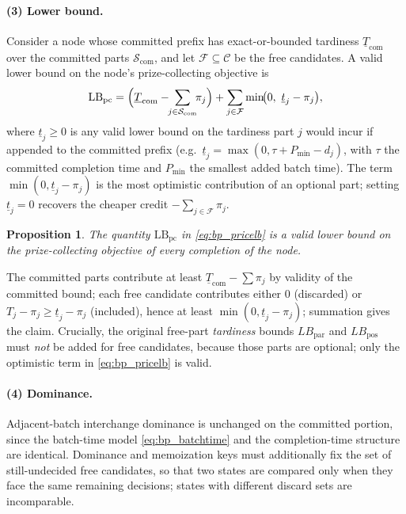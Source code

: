 \documentclass[review,3p,times,authoryear]{elsarticle}
\newtheorem{proposition}{Proposition}
\begin{document}
\paragraph{(3) Lower bound.} Consider a node whose committed prefix has
exact-or-bounded tardiness $\underline{T}_{\mathrm{com}}$ over the committed parts
$\mathcal{S}_{\mathrm{com}}$, and let $\mathcal{F}\subseteq\mathcal{C}$ be the
free candidates. A valid lower bound on the node's prize-collecting objective is
\begin{equation}
\mathrm{LB}_{\mathrm{pc}}=
\Bigl(\underline{T}_{\mathrm{com}}-\!\!\sum_{j\in\mathcal{S}_{\mathrm{com}}}\!\!\pi_j\Bigr)
+\sum_{j\in\mathcal{F}}\min\!\bigl(0,\ \underline{t}_j-\pi_j\bigr),
\label{eq:bp_pricelb}
\end{equation}
where $\underline{t}_j\ge 0$ is any valid lower bound on the tardiness part $j$
would incur if appended to the committed prefix (e.g.\
$\underline{t}_j=\max(0,\tau+P_{\min}-d_j)$, with $\tau$ the committed completion
time and $P_{\min}$ the smallest added batch time). The term
$\min(0,\underline{t}_j-\pi_j)$ is the most optimistic contribution of an optional
part; setting $\underline{t}_j=0$ recovers the cheaper credit
$-\sum_{j\in\mathcal{F}}\pi_j$.

\begin{proposition}
The quantity $\mathrm{LB}_{\mathrm{pc}}$ in \eqref{eq:bp_pricelb} is a valid lower
bound on the prize-collecting objective of every completion of the node.
\end{proposition}
\noindent The committed parts contribute at least
$\underline{T}_{\mathrm{com}}-\sum\pi_j$ by validity of the committed bound; each
free candidate contributes either $0$ (discarded) or
$T_j-\pi_j\ge\underline{t}_j-\pi_j$ (included), hence at least
$\min(0,\underline{t}_j-\pi_j)$; summation gives the claim. Crucially, the original
free-part \emph{tardiness} bounds $LB_{\mathrm{par}}$ and $LB_{\mathrm{pos}}$ must
\emph{not} be added for free candidates, because those parts are optional; only the
optimistic term in \eqref{eq:bp_pricelb} is valid.

\paragraph{(4) Dominance.} Adjacent-batch interchange dominance is unchanged on the
committed portion, since the batch-time model \eqref{eq:bp_batchtime} and the
completion-time structure are identical. Dominance and memoization keys must
additionally fix the set of still-undecided free candidates, so that two states are
compared only when they face the same remaining decisions; states with different
discard sets are incomparable.
\end{document}
